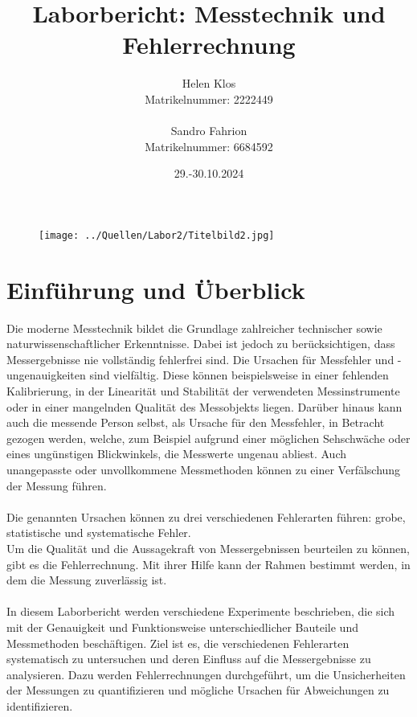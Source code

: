 \documentclass[a4paper,12pt]{article}
\title{Laborbericht: Messtechnik und Fehlerrechnung}
\author{Helen Klos \\Matrikelnummer: 2222449 \\ \\Sandro Fahrion \\Matrikelnummer: 6684592}
\date{29.-30.10.2024}
\begin{document}
\sloppy
\setlength{\emergencystretch}{5pt}
\maketitle

\begin{figure}[H]
    \centering
    \texttt{[image: ../Quellen/Labor2/Titelbild2.jpg]}
\end{figure}
\newpage
\tableofcontents
\newpage

\section*{Einführung und Überblick}
Die moderne Messtechnik bildet die Grundlage zahlreicher technischer sowie naturwissenschaftlicher Erkenntnisse. Dabei ist jedoch zu berücksichtigen, dass Messergebnisse nie vollständig fehlerfrei sind. Die Ursachen für Messfehler und -ungenauigkeiten sind vielfältig. Diese können beispielsweise in einer fehlenden Kalibrierung, in der Linearität und Stabilität der verwendeten Messinstrumente oder in einer mangelnden Qualität des Messobjekts liegen. Darüber hinaus kann auch die messende Person selbst, als Ursache für den Messfehler, in Betracht gezogen werden, welche, zum Beispiel aufgrund einer möglichen Sehschwäche oder eines ungünstigen Blickwinkels, die Messwerte ungenau abliest. Auch unangepasste oder unvollkommene Messmethoden können zu einer Verfälschung der Messung führen.\\\\
Die genannten Ursachen können zu drei verschiedenen Fehlerarten führen: grobe, statistische und systematische Fehler.\\
Um die Qualität und die Aussagekraft von Messergebnissen beurteilen zu können, gibt es die Fehlerrechnung. Mit ihrer Hilfe kann der Rahmen bestimmt werden, in dem die Messung zuverlässig ist.\\\\
\noindent In diesem Laborbericht werden verschiedene Experimente beschrieben, die sich mit der Genauigkeit und Funktionsweise unterschiedlicher Bauteile und Messmethoden beschäftigen. Ziel ist es, die verschiedenen Fehlerarten systematisch zu untersuchen und deren Einfluss auf die Messergebnisse zu analysieren. Dazu werden Fehlerrechnungen durchgeführt, um die Unsicherheiten der Messungen zu quantifizieren und mögliche Ursachen für Abweichungen zu identifizieren.
\end{document}
